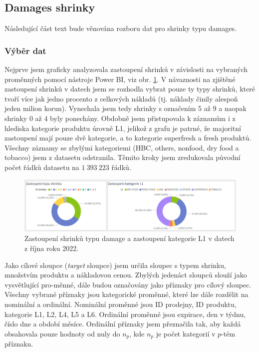 \subsection*{Damages shrinky}
Následující část text bude věnována rozboru dat pro shrinky typu damages.



\subsubsection{Výběr dat}

Nejprve jsem graficky analyzovala zastoupení shrinků v závislosti na vybraných proměnných pomocí nástroje Power BI, viz obr. \ref*{obr:rok:g:zastoupeni1}. V návaznosti na zjištěné zastoupení shrinků v datech jsem se rozhodla vybrat pouze ty typy shrinků, které tvoří více jak jedno procento z celkových nákladů (tj. náklady činily alespoň jeden milion korun). Vynechala jsem tedy shrinky s označením 5 až 9 a naopak shrinky 0 až 4 byly ponechány. Obdobně jsem přistupovala k záznamům i z hlediska kategorie produktu úrovně L1, jelikož z grafu je patrné, že majoritní zastoupení mají pouze dvě kategorie, a to kategorie superfresh a fresh produktů. Všechny záznamy se zbylými kategoriemi (HBC, others, nonfood, dry food a tobacco) jsem z datasetu odstranila. Těmito kroky jsem zredukovala původní počet řádků datasetu na $1\ 393\ 223$ řádků.

\begin{figure}[hbtp!]
    \centering
    \captionsetup{justification=centering}
    \includegraphics[width=\textwidth]{obrazky/grafy/zastoupeni1.png}
    \caption{Zastoupení shrinků typu damage a zastoupení kategorie L1 v datech \\ z října roku 2022.}
    \label{obr:rok:g:zastoupeni1}
\end{figure}

Jako cílové sloupce (\emph{target} sloupce) jsem určila sloupec s typem shrinku, množstvím produktu a nákladovou cenou. Zbylých jedenáct sloupců slouží jako vysvětlující pro-\linebreak měnné, dále budou označovány jako příznaky pro cílový sloupec. Všechny vybrané příznaky jsou kategorické proměnné, které lze dále rozdělit na nominální a ordinální. Nominální proměnné jsou ID prodejny, ID produktu, kategorie L1, L2, L4, L5 a L6. Ordinální proměnné jsou expirace, den v týdnu, číslo dne a období měsíce. Ordinální příznaky jsem přeznačila tak, aby každá obsahovala pouze hodnoty od nuly do $n_p$, kde $n_p$ je počet kategorií v $p$-tém příznaku. 

